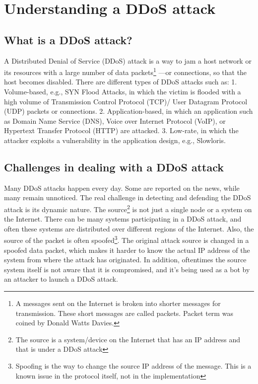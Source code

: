 \documentclass[12pt,oneside,a4paper]{article}
\begin{document}

\doublespacing
\renewcommand{\thepage}{\roman{page}}%
\setcounter{page}{2}%

\tableofcontents
\newpage
\pagestyle{myheadings}

\pagebreak
\renewcommand{\thepage}{\arabic{page}}%
\setcounter{page}{1}%

\section{Understanding a DDoS attack}

\subsection{What is a DDoS attack?}
A Distributed Denial of Service (DDoS) attack is a way to jam a host network or its resources with a large number of data packets\footnote{A messages sent on the Internet is broken into shorter messages for transmission. These short messages are called packets. Packet term was coined by Donald Watts Davies.} \cite{network-data-packet} ---or connections, so that the host becomes disabled. There are different types of DDoS attacks such as:
1. Volume-based, e.g., SYN Flood Attacks, in which the victim is flooded with a high volume of  Transmission Control Protocol (TCP)/ User Datagram Protocol (UDP) packets or connections.
2. Application-based, in which an application such as Domain Name Service (DNS), Voice over Internet Protocol (VoIP), or Hypertext Transfer Protocol (HTTP) are attacked.
3. Low-rate, in which the attacker exploits a vulnerability in the application design, e.g., Slowloris.
\cite{DDoS-attacks}

\subsection{Challenges in dealing with a DDoS attack}
Many DDoS attacks happen every day\cite{ddos-attack-news}. Some are reported on the news, while many remain unnoticed. The real challenge in detecting and defending the DDoS attack is its dynamic nature. The source\footnote{The source is a system/device on the Internet that has an IP address and that is under a DDoS attack} is not just a single node or a system on the Internet. There can be many systems participating in a DDoS attack, and often these systems are distributed over different regions of the Internet. Also, the source of the packet is often spoofed\footnote{Spoofing is the way to change the source IP address of the message. This is a known issue in the protocol itself, not in the implementation}\cite{ip-spoofing}. The original attack source is changed in a spoofed data packet, which makes it harder to know the actual IP address of the system from where the attack has originated. In addition, oftentimes the source system itself is not aware that it is compromised, and it's being used as a bot\cite{bot} by an attacker to launch a DDoS attack.
\end{document}
